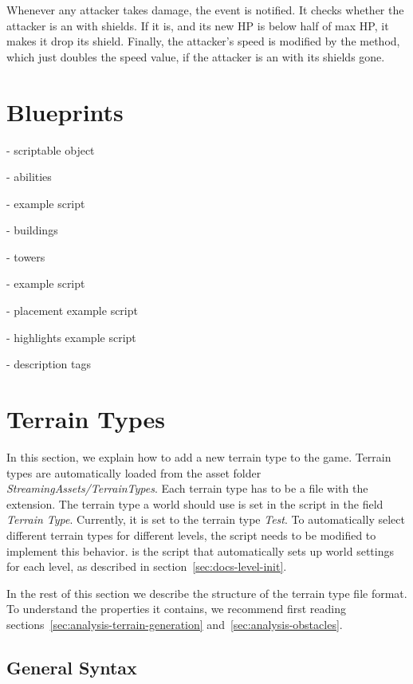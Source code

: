 Whenever any attacker takes damage, the  event is notified.
It checks whether the attacker is an  with shields.
If it is, and its new HP is below half of max HP, it makes it drop its shield.
Finally, the attacker's speed is modified by the  method, which just doubles the speed value, if the attacker is an  with its shields gone.

\section{Blueprints}

- scriptable object

- abilities

- example script

- buildings

- towers

- example script

- placement example script

- highlights example script

- description tags

\section{Terrain Types}\label{sec:docs-terrain-type}

In this section, we explain how to add a new terrain type to the game.
Terrain types are automatically loaded from the asset folder \emph{StreamingAssets/TerrainTypes}.
Each terrain type has to be a file with the  extension.
The terrain type a world should use is set in the  script in the field \emph{Terrain Type}.
Currently, it is set to the terrain type \emph{Test}.
To automatically select different terrain types for different levels, the  script needs to be modified to implement this behavior.
 is the script that automatically sets up world settings for each level, as described in section~\ref{sec:docs-level-init}.

In the rest of this section we describe the structure of the terrain type file format.
To understand the properties it contains, we recommend first reading sections~\ref{sec:analysis-terrain-generation} and~\ref{sec:analysis-obstacles}.

\subsection{General Syntax}

